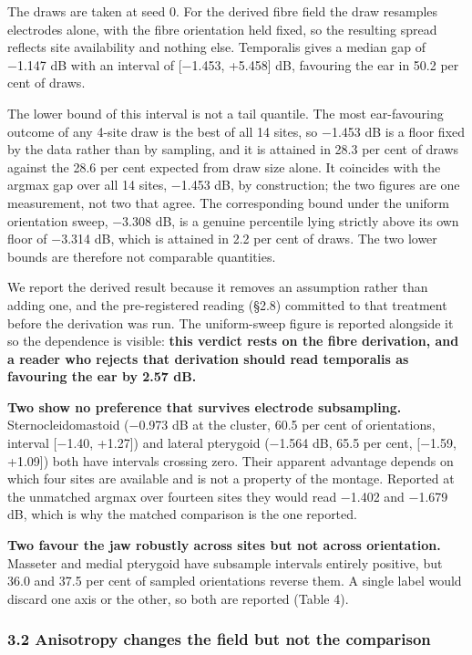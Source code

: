 \documentclass[
  11pt,
]{article}
\begin{document}
The draws are taken at seed 0. For the derived fibre field the
draw resamples electrodes alone, with the fibre orientation held fixed, so the
resulting spread reflects site availability and nothing else. Temporalis gives a
median gap of −1.147 dB with an interval of {[}−1.453, +5.458{]} dB, favouring the
ear in 50.2 per cent of draws.

The lower bound of this interval is not a tail quantile. The most
ear-favouring outcome of any 4-site draw is the best of all 14 sites, so
−1.453 dB is a floor fixed by the data rather than by sampling, and it is
attained in 28.3 per cent of draws against the 28.6 per cent expected from draw
size alone. It coincides with the argmax gap over all 14 sites, −1.453 dB, by
construction; the two figures are one measurement, not two that agree. The
corresponding bound under the uniform orientation sweep, −3.308 dB, is a
genuine percentile lying strictly above its own floor of −3.314 dB, which is
attained in 2.2 per cent of draws. The two lower bounds are therefore not
comparable quantities.

We report the derived result because it removes an assumption rather than
adding one, and the pre-registered reading (§2.8) committed to that treatment
before the derivation was run. The uniform-sweep figure is reported alongside
it so the dependence is visible: \textbf{this verdict rests on the fibre derivation,
and a reader who rejects that derivation should read temporalis as favouring
the ear by 2.57 dB.}

\textbf{Two show no preference that survives electrode subsampling.}
Sternocleidomastoid (−0.973 dB at the cluster, 60.5 per cent of orientations,
interval {[}−1.40, +1.27{]}) and lateral pterygoid (−1.564 dB, 65.5 per cent,
{[}−1.59, +1.09{]}) both have intervals crossing zero. Their apparent advantage
depends on which four sites are available and is not a property of the
montage. Reported at the unmatched argmax over fourteen sites they would read
−1.402 and −1.679 dB, which is why the matched comparison is the one reported.

\textbf{Two favour the jaw robustly across sites but not across orientation.}
Masseter and medial pterygoid have subsample intervals entirely positive, but
36.0 and 37.5 per cent of sampled orientations reverse them. A single label
would discard one axis or the other, so both are reported (Table 4).

\subsubsection{3.2 Anisotropy changes the field but not the comparison}\label{anisotropy-changes-the-field-but-not-the-comparison}
\end{document}
